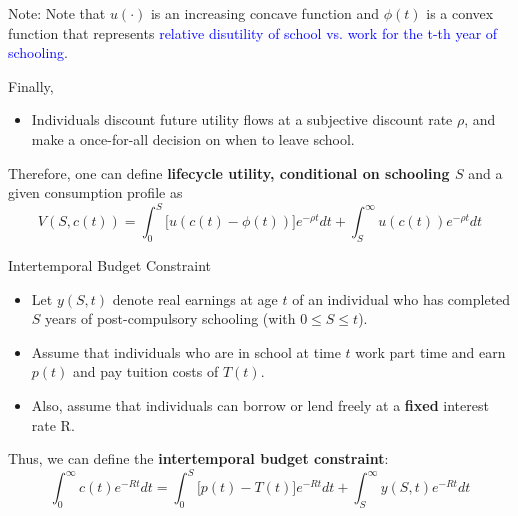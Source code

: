 \documentclass{beamer}
\begin{document}
\begin{frame}{}
    \begin{block}{Note:}
        Note that $u(\cdot)$ is an increasing concave function and $\phi(t)$ is a convex function that represents \textcolor{blue}{relative disutility of school vs. work for the t-th year of schooling}.
    \end{block}
 Finally, 
 \begin{itemize}
     \item Individuals discount future utility flows at a subjective discount rate $\rho$, and make a once-for-all decision on when to leave school.
 \end{itemize}
 
 Therefore, one can define \textbf{lifecycle utility, conditional on schooling $S$} and a given consumption profile as
 \begin{equation*}
     V(S,c(t))=\int_{0}^{S}\Big[ u(c(t)-\phi(t))\Big]e^{-\rho t} dt + \int_{S}^{\infty}u(c(t))e^{-\rho t} dt
 \end{equation*}
 
\end{frame}

\begin{frame}{Intertemporal Budget Constraint}
\begin{itemize}
    \item Let $y(S,t)$ denote real earnings at age $t$ of an individual who has completed $S$ years of post-compulsory schooling (with $0\leq S \leq t$).
    \item Assume that individuals who are in school at time $t$ work part time and earn $p(t)$ and pay tuition costs of $T(t)$. 
    \item Also, assume that individuals can borrow or lend freely at a \textbf{fixed} interest rate R. 
\end{itemize}

Thus, we can define the \textbf{intertemporal budget constraint}: 
\begin{equation*}
    \int_{0}^{\infty}c(t)e^{-Rt}dt= \int_{0}^{S}\Big[ p(t)- T(t)\Big]e^{-R t} dt + \int_{S}^{\infty}y(S,t)e^{-R t} dt
\end{equation*}

\end{frame}
\end{document}
